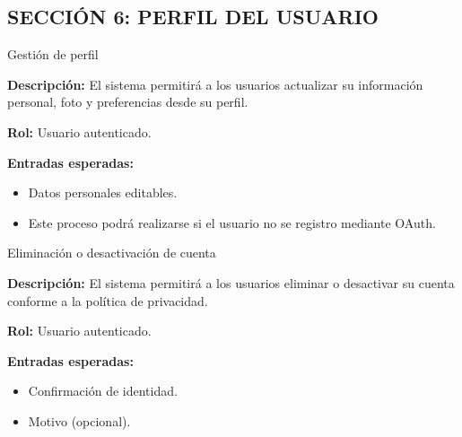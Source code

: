 \subsection*{\uppercase{Sección 6: Perfil del Usuario}}
\begin{requisito}{Gestión de perfil}
	\item \textbf{Descripción:} El sistema permitirá a los usuarios  actualizar su información personal, foto y preferencias desde su perfil.
	\item \textbf{Rol:} Usuario autenticado.
	\item \textbf{Entradas esperadas:}
	\begin{itemize}
		\item Datos personales editables.
		\item Este proceso podrá realizarse si el usuario no se registro mediante OAuth.
	\end{itemize}
\end{requisito}
\begin{requisito}{Eliminación o desactivación de cuenta}
	\item \textbf{Descripción:} El sistema permitirá a los usuarios eliminar o desactivar su cuenta conforme a la política de privacidad.
	\item \textbf{Rol:} Usuario autenticado.
	\item \textbf{Entradas esperadas:}
	\begin{itemize}
		\item Confirmación de identidad.
		\item Motivo (opcional).
	\end{itemize}
\end{requisito}
